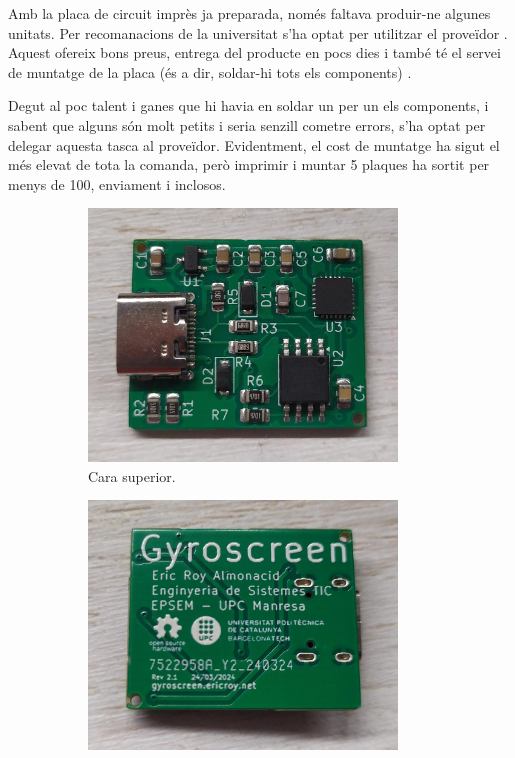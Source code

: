Amb la placa de circuit imprès ja preparada, només faltava produir-ne algunes
unitats. Per recomanacions de la universitat s'ha optat per utilitzar el
proveïdor . Aquest ofereix bons preus, entrega del producte en pocs
dies i també té el servei de muntatge de la placa (és a dir, soldar-hi tots els
components) \cite{JlcPcb}.

Degut al poc talent i ganes que hi havia en soldar un per un els components, i
sabent que alguns són molt petits i seria senzill cometre errors, s'ha optat
per delegar aquesta tasca al proveïdor. Evidentment, el cost de muntatge ha
sigut el més elevat de tota la comanda, però imprimir i muntar 5 plaques
ha sortit per menys de \SI[round-mode=places,round-precision=0]{100}{\EUR},
enviament i  inclosos.

\begin{figure}[ht]
    \centering
    \begin{subfigure}{0.45\textwidth}
        \centering
        \includegraphics[width=0.9\textwidth]{images/device/top.jpeg}
        \caption{Cara superior.}
        \label{fig:printedpcb_top}
    \end{subfigure}
    \begin{subfigure}{0.45\textwidth}
        \centering
        \includegraphics[width=0.9\textwidth]{images/device/bottom.jpeg}

\end{subfigure}
\end{figure}
